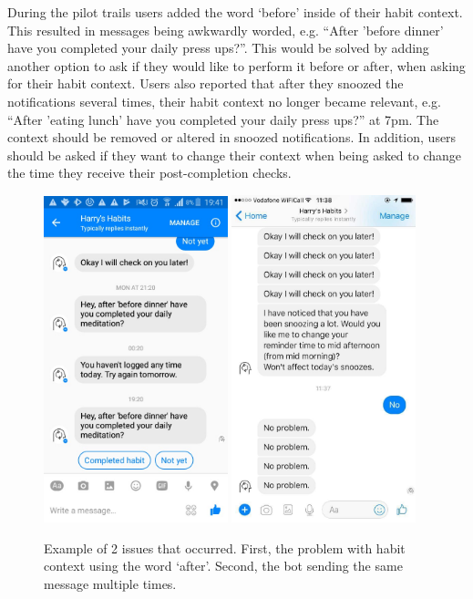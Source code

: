 During the pilot trails users added the word `before' inside of their habit context. This resulted in messages being awkwardly worded, e.g. ``After 'before dinner' have you completed your daily press ups?''. This would be solved by adding another option to ask if they would like to perform it before or after, when asking for their habit context. Users also reported that after they snoozed the notifications several times, their habit context no longer became relevant, e.g. ``After 'eating lunch' have you completed your daily press ups?'' at 7pm. The context should be removed or altered in snoozed notifications. In addition, users should be asked if they want to change their context when being asked to change the time they receive their post-completion checks.

\begin{figure}[H]
  \centering
  \includegraphics[width=2.1in]{../resources/feedback/after-before.jpg}
  \hspace{10px}
  \includegraphics[width=2.1in]{../resources/feedback/double-messages.jpg}
  \caption{Example of 2 issues that occurred. First, the problem with habit context using the word `after'. Second, the bot sending the same message multiple times.}
  \label{fig:study_bot_issues}
\end{figure}


